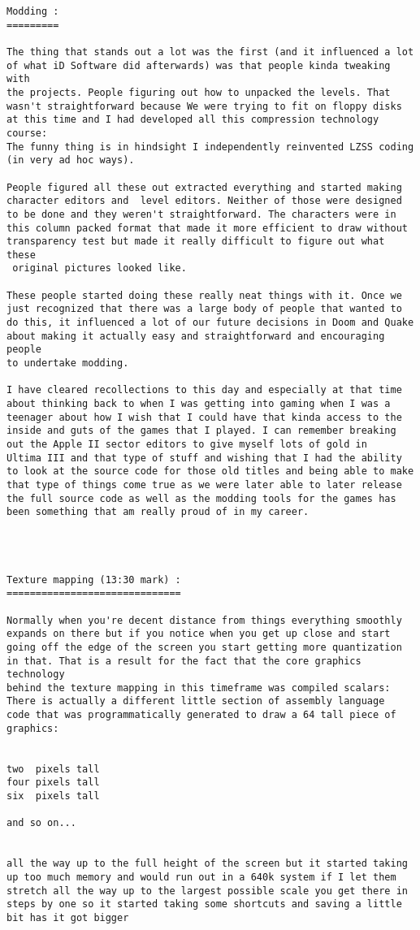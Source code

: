 \documentclass[book.tex]{subfiles}
\begin{document}
\begin{breakable_box}
\begin{verbatim}
Modding :
=========

The thing that stands out a lot was the first (and it influenced a lot
of what iD Software did afterwards) was that people kinda tweaking with
the projects. People figuring out how to unpacked the levels. That 
wasn't straightforward because We were trying to fit on floppy disks 
at this time and I had developed all this compression technology course:
The funny thing is in hindsight I independently reinvented LZSS coding 
(in very ad hoc ways). 

People figured all these out extracted everything and started making 
character editors and  level editors. Neither of those were designed 
to be done and they weren't straightforward. The characters were in 
this column packed format that made it more efficient to draw without 
transparency test but made it really difficult to figure out what these
 original pictures looked like. 

These people started doing these really neat things with it. Once we 
just recognized that there was a large body of people that wanted to 
do this, it influenced a lot of our future decisions in Doom and Quake 
about making it actually easy and straightforward and encouraging people 
to undertake modding.

I have cleared recollections to this day and especially at that time 
about thinking back to when I was getting into gaming when I was a 
teenager about how I wish that I could have that kinda access to the 
inside and guts of the games that I played. I can remember breaking 
out the Apple II sector editors to give myself lots of gold in 
Ultima III and that type of stuff and wishing that I had the ability 
to look at the source code for those old titles and being able to make 
that type of things come true as we were later able to later release  
the full source code as well as the modding tools for the games has 
been something that am really proud of in my career.




Texture mapping (13:30 mark) :
==============================

Normally when you're decent distance from things everything smoothly 
expands on there but if you notice when you get up close and start 
going off the edge of the screen you start getting more quantization 
in that. That is a result for the fact that the core graphics technology 
behind the texture mapping in this timeframe was compiled scalars: 
There is actually a different little section of assembly language 
code that was programmatically generated to draw a 64 tall piece of 
graphics:


two  pixels tall 
four pixels tall 
six  pixels tall

and so on...


all the way up to the full height of the screen but it started taking 
up too much memory and would run out in a 640k system if I let them 
stretch all the way up to the largest possible scale you get there in 
steps by one so it started taking some shortcuts and saving a little 
bit has it got bigger
   
   \end{verbatim}
\end{breakable_box}
\end{document}
